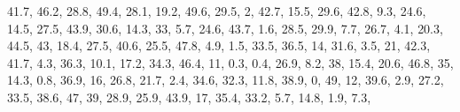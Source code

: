 \documentclass[]{book}
\newenvironment{Shaded}{\begin{snugshade}}{\end{snugshade}}
\newcommand{\DecValTok}[1]{\textcolor[rgb]{0.00,0.00,0.81}{#1}}
\newcommand{\FloatTok}[1]{\textcolor[rgb]{0.00,0.00,0.81}{#1}}
\newcommand{\NormalTok}[1]{#1}
\begin{document}
\begin{Shaded}
\begin{Highlighting}[]
    \FloatTok{41.7}\NormalTok{, }\FloatTok{46.2}\NormalTok{, }\FloatTok{28.8}\NormalTok{, }\FloatTok{49.4}\NormalTok{, }\FloatTok{28.1}\NormalTok{, }\FloatTok{19.2}\NormalTok{, }\FloatTok{49.6}\NormalTok{, }\FloatTok{29.5}\NormalTok{, }\DecValTok{2}\NormalTok{, }\FloatTok{42.7}\NormalTok{, }\FloatTok{15.5}\NormalTok{, }\FloatTok{29.6}\NormalTok{, }\FloatTok{42.8}\NormalTok{, }
    \FloatTok{9.3}\NormalTok{, }\FloatTok{24.6}\NormalTok{, }\FloatTok{14.5}\NormalTok{, }\FloatTok{27.5}\NormalTok{, }\FloatTok{43.9}\NormalTok{, }\FloatTok{30.6}\NormalTok{, }\FloatTok{14.3}\NormalTok{, }\DecValTok{33}\NormalTok{, }\FloatTok{5.7}\NormalTok{, }\FloatTok{24.6}\NormalTok{, }\FloatTok{43.7}\NormalTok{, }\FloatTok{1.6}\NormalTok{, }\FloatTok{28.5}\NormalTok{, }
    \FloatTok{29.9}\NormalTok{, }\FloatTok{7.7}\NormalTok{, }\FloatTok{26.7}\NormalTok{, }\FloatTok{4.1}\NormalTok{, }\FloatTok{20.3}\NormalTok{, }\FloatTok{44.5}\NormalTok{, }\DecValTok{43}\NormalTok{, }\FloatTok{18.4}\NormalTok{, }\FloatTok{27.5}\NormalTok{, }\FloatTok{40.6}\NormalTok{, }\FloatTok{25.5}\NormalTok{, }\FloatTok{47.8}\NormalTok{, }\FloatTok{4.9}\NormalTok{, }
    \FloatTok{1.5}\NormalTok{, }\FloatTok{33.5}\NormalTok{, }\FloatTok{36.5}\NormalTok{, }\DecValTok{14}\NormalTok{, }\FloatTok{31.6}\NormalTok{, }\FloatTok{3.5}\NormalTok{, }\DecValTok{21}\NormalTok{, }\FloatTok{42.3}\NormalTok{, }\FloatTok{41.7}\NormalTok{, }\FloatTok{4.3}\NormalTok{, }\FloatTok{36.3}\NormalTok{, }\FloatTok{10.1}\NormalTok{, }\FloatTok{17.2}\NormalTok{, }\FloatTok{34.3}\NormalTok{, }
    \FloatTok{46.4}\NormalTok{, }\DecValTok{11}\NormalTok{, }\FloatTok{0.3}\NormalTok{, }\FloatTok{0.4}\NormalTok{, }\FloatTok{26.9}\NormalTok{, }\FloatTok{8.2}\NormalTok{, }\DecValTok{38}\NormalTok{, }\FloatTok{15.4}\NormalTok{, }\FloatTok{20.6}\NormalTok{, }\FloatTok{46.8}\NormalTok{, }\DecValTok{35}\NormalTok{, }\FloatTok{14.3}\NormalTok{, }\FloatTok{0.8}\NormalTok{, }\FloatTok{36.9}\NormalTok{, }
    \DecValTok{16}\NormalTok{, }\FloatTok{26.8}\NormalTok{, }\FloatTok{21.7}\NormalTok{, }\FloatTok{2.4}\NormalTok{, }\FloatTok{34.6}\NormalTok{, }\FloatTok{32.3}\NormalTok{, }\FloatTok{11.8}\NormalTok{, }\FloatTok{38.9}\NormalTok{, }\DecValTok{0}\NormalTok{, }\DecValTok{49}\NormalTok{, }\DecValTok{12}\NormalTok{, }\FloatTok{39.6}\NormalTok{, }\FloatTok{2.9}\NormalTok{, }\FloatTok{27.2}\NormalTok{, }
    \FloatTok{33.5}\NormalTok{, }\FloatTok{38.6}\NormalTok{, }\DecValTok{47}\NormalTok{, }\DecValTok{39}\NormalTok{, }\FloatTok{28.9}\NormalTok{, }\FloatTok{25.9}\NormalTok{, }\FloatTok{43.9}\NormalTok{, }\DecValTok{17}\NormalTok{, }\FloatTok{35.4}\NormalTok{, }\FloatTok{33.2}\NormalTok{, }\FloatTok{5.7}\NormalTok{, }\FloatTok{14.8}\NormalTok{, }\FloatTok{1.9}\NormalTok{, }\FloatTok{7.3}\NormalTok{, }

\end{Highlighting}
\end{Shaded}
\end{document}
